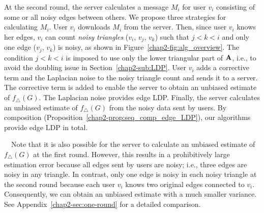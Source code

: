 At the second round, the server calculates a message $M_i$ for user $v_i$ consisting of some or all noisy edges between others. 
We propose three strategies for calculating $M_i$. 
User $v_i$ downloads $M_i$ from the server.
Then, since user $v_i$ knows her edges, $v_i$ can count \textit{noisy triangles} ($v_i$, $v_j$, $v_k$) such that $j<k<i$ and only one edge ($v_j$, $v_k$) is noisy, as shown in Figure~\ref{chap2-fig:alg_overview}. 
The condition $j<k<i$ is imposed to use only the lower triangular part of $\mathbf{A}$, i.e., 
to avoid the doubling issue in Section~\ref{chap2-sub:LDP}. 
User $v_i$ adds %
a corrective term
and the Laplacian noise
to the noisy triangle count 
and sends it to a server.
The corrective term is added to enable the server to obtain an unbiased estimate of $f_\triangle(G)$. 
The Laplacian noise provides
edge LDP.
Finally,
the server calculates an unbiased estimate of $f_\triangle(G)$
from the noisy data sent by users.
By composition (Proposition~\ref{chap2-prop:seq_comp_edge_LDP}),
our algorithms provide
edge LDP in total.

\smallskip
{}~~Note that it is also possible for the server to calculate an unbiased estimate of $f_\triangle(G)$ at the first round.
However, this results in a
prohibitively
large estimation error
because
all edges sent by users are noisy; i.e., three edges are noisy in any triangle.
In contrast, only one edge is noisy in each noisy triangle at the second round because each user $v_i$ knows two original edges
connected to $v_i$.
Consequently, we can obtain an unbiased estimate with a much smaller variance.
See Appendix~\ref{chap2-sec:one-round} for a detailed comparison.

